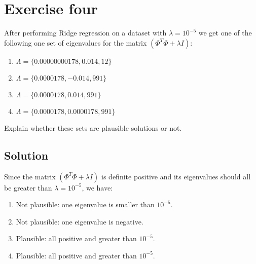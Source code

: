 \section{Exercise four}

After performing Ridge regression on a dataset with $\lambda = 10^{-5}$ we get one of the following one set of eigenvalues for the matrix $\left(\Phi^T \Phi + \lambda I\right)$:
\begin{enumerate}
    \item $\Lambda = \{0.00000000178, 0.014, 12\}$
    \item $\Lambda = \{0.0000178, -0.014, 991\}$
    \item $\Lambda = \{0.0000178, 0.014, 991\}$
    \item $\Lambda = \{0.0000178, 0.0000178, 991\}$
\end{enumerate}
Explain whether these sets are plausible solutions or not.

\subsection{Solution}
Since the matrix $\left(\Phi^T \Phi + \lambda I\right)$ is definite positive and its eigenvalues should all be greater than $\lambda = 10^{-5}$, we have:
\begin{enumerate}
    \item Not plausible: one eigenvalue is smaller than $10^{-5}$.
    \item Not plausible: one eigenvalue is negative.
    \item Plausible: all positive and greater than $10^{-5}$.
    \item Plausible: all positive and greater than $10^{-5}$.
\end{enumerate}